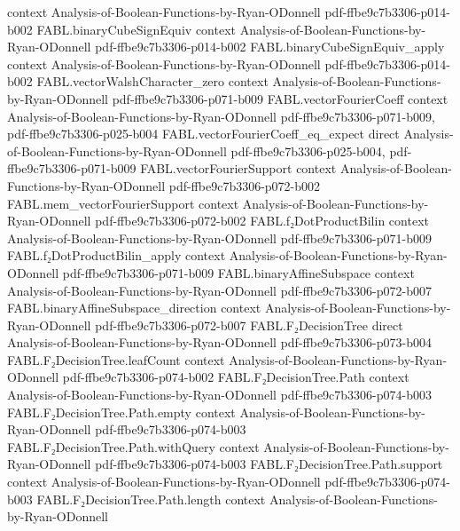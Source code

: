 \begin{theorem}
  {context}
  {Analysis-of-Boolean-Functions-by-Ryan-ODonnell}
  {pdf-ffbe9c7b3306-p014-b002}
\proofstep
  {FABL.binaryCubeSignEquiv}
  {context}
  {Analysis-of-Boolean-Functions-by-Ryan-ODonnell}
  {pdf-ffbe9c7b3306-p014-b002}
\proofstep
  {FABL.binaryCubeSignEquiv_apply}
  {context}
  {Analysis-of-Boolean-Functions-by-Ryan-ODonnell}
  {pdf-ffbe9c7b3306-p014-b002}
\proofstep
  {FABL.vectorWalshCharacter_zero}
  {context}
  {Analysis-of-Boolean-Functions-by-Ryan-ODonnell}
  {pdf-ffbe9c7b3306-p071-b009}
\proofstep
  {FABL.vectorFourierCoeff}
  {context}
  {Analysis-of-Boolean-Functions-by-Ryan-ODonnell}
  {pdf-ffbe9c7b3306-p071-b009,
    pdf-ffbe9c7b3306-p025-b004}
\proofstep
  {FABL.vectorFourierCoeff_eq_expect}
  {direct}
  {Analysis-of-Boolean-Functions-by-Ryan-ODonnell}
  {pdf-ffbe9c7b3306-p025-b004,
    pdf-ffbe9c7b3306-p071-b009}
\proofstep
  {FABL.vectorFourierSupport}
  {context}
  {Analysis-of-Boolean-Functions-by-Ryan-ODonnell}
  {pdf-ffbe9c7b3306-p072-b002}
\proofstep
  {FABL.mem_vectorFourierSupport}
  {context}
  {Analysis-of-Boolean-Functions-by-Ryan-ODonnell}
  {pdf-ffbe9c7b3306-p072-b002}
\proofstep
  {FABL.f₂DotProductBilin}
  {context}
  {Analysis-of-Boolean-Functions-by-Ryan-ODonnell}
  {pdf-ffbe9c7b3306-p071-b009}
\proofstep
  {FABL.f₂DotProductBilin_apply}
  {context}
  {Analysis-of-Boolean-Functions-by-Ryan-ODonnell}
  {pdf-ffbe9c7b3306-p071-b009}
\proofstep
  {FABL.binaryAffineSubspace}
  {context}
  {Analysis-of-Boolean-Functions-by-Ryan-ODonnell}
  {pdf-ffbe9c7b3306-p072-b007}
\proofstep
  {FABL.binaryAffineSubspace_direction}
  {context}
  {Analysis-of-Boolean-Functions-by-Ryan-ODonnell}
  {pdf-ffbe9c7b3306-p072-b007}
\proofstep
  {FABL.F₂DecisionTree}
  {direct}
  {Analysis-of-Boolean-Functions-by-Ryan-ODonnell}
  {pdf-ffbe9c7b3306-p073-b004}
\proofstep
  {FABL.F₂DecisionTree.leafCount}
  {context}
  {Analysis-of-Boolean-Functions-by-Ryan-ODonnell}
  {pdf-ffbe9c7b3306-p074-b002}
\proofstep
  {FABL.F₂DecisionTree.Path}
  {context}
  {Analysis-of-Boolean-Functions-by-Ryan-ODonnell}
  {pdf-ffbe9c7b3306-p074-b003}
\proofstep
  {FABL.F₂DecisionTree.Path.empty}
  {context}
  {Analysis-of-Boolean-Functions-by-Ryan-ODonnell}
  {pdf-ffbe9c7b3306-p074-b003}
\proofstep
  {FABL.F₂DecisionTree.Path.withQuery}
  {context}
  {Analysis-of-Boolean-Functions-by-Ryan-ODonnell}
  {pdf-ffbe9c7b3306-p074-b003}
\proofstep
  {FABL.F₂DecisionTree.Path.support}
  {context}
  {Analysis-of-Boolean-Functions-by-Ryan-ODonnell}
  {pdf-ffbe9c7b3306-p074-b003}
\proofstep
  {FABL.F₂DecisionTree.Path.length}
  {context}
  {Analysis-of-Boolean-Functions-by-Ryan-ODonnell}

\end{theorem}
